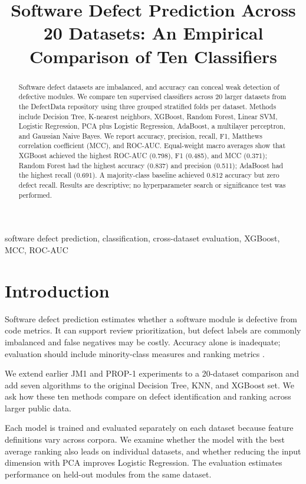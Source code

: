\documentclass[conference]{IEEEtran}
\title{Software Defect Prediction Across 20 Datasets: An Empirical Comparison of Ten Classifiers}
\author{\IEEEauthorblockN{Aditya Dubey}}
\begin{document}
\maketitle
\begin{abstract}
Software defect datasets are imbalanced, and accuracy can conceal weak detection of defective modules. We compare ten supervised classifiers across 20 larger datasets from the DefectData repository using three grouped stratified folds per dataset. Methods include Decision Tree, K-nearest neighbors, XGBoost, Random Forest, Linear SVM, Logistic Regression, PCA plus Logistic Regression, AdaBoost, a multilayer perceptron, and Gaussian Naive Bayes. We report accuracy, precision, recall, F1, Matthews correlation coefficient (MCC), and ROC-AUC. Equal-weight macro averages show that XGBoost achieved the highest ROC-AUC (0.798), F1 (0.485), and MCC (0.371); Random Forest had the highest accuracy (0.837) and precision (0.511); AdaBoost had the highest recall (0.691). A majority-class baseline achieved 0.812 accuracy but zero defect recall. Results are descriptive; no hyperparameter search or significance test was performed.
\end{abstract}
\begin{IEEEkeywords}
software defect prediction, classification, cross-dataset evaluation, XGBoost, MCC, ROC-AUC
\end{IEEEkeywords}
\section{Introduction}
Software defect prediction estimates whether a software module is defective from code metrics. It can support review prioritization, but defect labels are commonly imbalanced and false negatives may be costly. Accuracy alone is inadequate; evaluation should include minority-class measures and ranking metrics \cite{menzies2007,kamei2013}.

We extend earlier JM1 and PROP-1 experiments to a 20-dataset comparison and add seven algorithms to the original Decision Tree, KNN, and XGBoost set. We ask how these ten methods compare on defect identification and ranking across larger public data.

Each model is trained and evaluated separately on each dataset because feature definitions vary across corpora. We examine whether the model with the best average ranking also leads on individual datasets, and whether reducing the input dimension with PCA improves Logistic Regression. The evaluation estimates performance on held-out modules from the same dataset.
\end{document}
